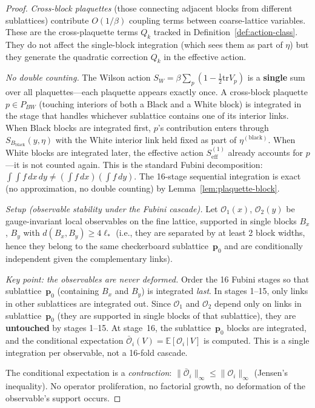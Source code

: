\documentclass[11pt]{article}
\theoremstyle{definition}
\newcommand{\tr}{\mathrm{tr}}
\begin{document}
\begin{proof}
\emph{Cross-block plaquettes} (those connecting adjacent blocks
from different sublattices) contribute $O(1/\beta)$
coupling terms between coarse-lattice variables.
These are the cross-plaquette terms $Q_k$ tracked in
Definition~\ref{def:action-class}.  They do not affect
the single-block integration (which sees them as part
of $\eta$) but they generate the quadratic correction
$Q_k$ in the effective action.

\emph{No double counting.}
The Wilson action $S_W=\beta\sum_p(1-\frac{1}{2}\tr V_p)$ is
a \textbf{single} sum over all plaquettes---each plaquette
appears exactly once.  A cross-block plaquette $p\in P_{BW}$
(touching interiors of both a Black and a White block) is
integrated in the stage that handles whichever sublattice
contains one of its interior links.  When Black blocks are
integrated first, $p$'s contribution enters through
$S_{B_{\mathrm{black}}}(y,\eta)$ with the White interior link
held fixed as part of $\eta^{(\mathrm{black})}$.
When White blocks are integrated later, the effective action
$S_{\mathrm{eff}}^{(1)}$ already accounts for $p$---it is
not counted again.  This is the standard Fubini
decomposition: $\int\int f\,dx\,dy\ne(\int f\,dx)(\int f\,dy)$.
The 16-stage sequential integration is exact (no approximation,
no double counting) by Lemma~\ref{lem:plaquette-block}.

\emph{Setup (observable stability under the Fubini cascade).}
Let $\mathcal{O}_1(x)$, $\mathcal{O}_2(y)$ be gauge-invariant local
observables on the fine lattice, supported in single blocks
$B_x$, $B_y$ with $d(B_x,B_y)\ge 4\ell_*$ (i.e., they are
separated by at least 2 block widths, hence they belong to
the same checkerboard sublattice~$\mathbf{p}_0$
and are conditionally independent given the complementary links).

\emph{Key point: the observables are never deformed.}
Order the 16 Fubini stages so that sublattice~$\mathbf{p}_0$
(containing $B_x$ and $B_y$) is integrated \emph{last}.
In stages 1--15, only links in other sublattices are
integrated out.  Since $\mathcal{O}_1$ and $\mathcal{O}_2$
depend only on links in sublattice~$\mathbf{p}_0$
(they are supported in single blocks of that sublattice),
they are \textbf{untouched} by stages 1--15.
At stage~16, the sublattice~$\mathbf{p}_0$ blocks are
integrated, and the conditional expectation
$\bar{\mathcal{O}}_i(V)=\mathbb{E}[\mathcal{O}_i\,|\,V]$
is computed.  This is a single integration per
observable, not a 16-fold cascade.

The conditional expectation is a \emph{contraction}:
$\|\bar{\mathcal{O}}_i\|_\infty\le\|\mathcal{O}_i\|_\infty$
(Jensen's inequality).  No operator proliferation, no
factorial growth, no deformation of the observable's
support occurs.


\end{proof}
\end{document}
